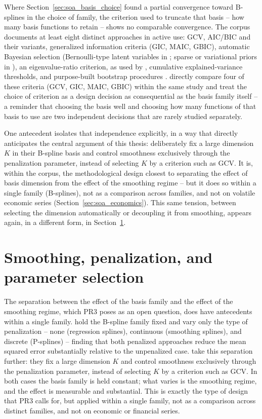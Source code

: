 Where Section~\ref{sec:soa_basis_choice} found a partial convergence
toward B-splines in the choice of family, the criterion used to truncate
that basis -- how many basis functions to retain -- shows no comparable
convergence. The corpus documents at least eight distinct approaches in
active use: GCV, AIC/BIC and their variants, generalized information
criteria (GIC, MAIC, GBIC), automatic Bayesian selection (Bernoulli-type
latent variables in \cite{sousa_bayesian_2024}; sparse or variational
priors in \cite{tao_integrated_2025}), an eigenvalue-ratio criterion, as
used by \cite{linshang_nonstationary_2025}, cumulative explained-variance
thresholds, and purpose-built bootstrap procedures \cite{diks_noise_2023}.
\cite{beyaztas_comparison_2022} directly compare four of these criteria
(GCV, GIC, MAIC, GBIC) within the same study and treat the choice of
criterion as a design decision as consequential as the basis family
itself -- a reminder that choosing the basis well and choosing how many
functions of that basis to use are two independent decisions that are
rarely studied separately.

One antecedent isolates that independence explicitly, in a way that
directly anticipates the central argument of this thesis:
\cite{gao_factor_2024} deliberately fix a large dimension $K$ in their
B-spline basis and control smoothness exclusively through the
penalization parameter, instead of selecting $K$ by a criterion such as
GCV. It is, within the corpus, the methodological design closest to
separating the effect of basis dimension from the effect of the
smoothing regime -- but it does so within a single family (B-splines),
not as a comparison across families, and not on volatile economic series
(Section~\ref{sec:soa_economics}). This same tension, between selecting
the dimension automatically or decoupling it from smoothing, appears
again, in a different form, in Section~\ref{sec:soa_smoothing}.

\section{Smoothing, penalization, and parameter selection}
\label{sec:soa_smoothing}

The separation between the effect of the basis family and the effect of
the smoothing regime, which PR3 poses as an open question, does have
antecedents within a single family. \cite{aguilera_comparative_2013} hold
the B-spline family fixed and vary only the type of penalization -- none
(regression splines), continuous (smoothing splines), and discrete
(P-splines) -- finding that both penalized approaches reduce the mean
squared error substantially relative to the unpenalized case.
\cite{gao_factor_2024} take this separation further: they fix a large
dimension $K$ and control smoothness exclusively through the
penalization parameter, instead of selecting $K$ by a criterion such as
GCV. In both cases the basis family is held constant; what varies is the
smoothing regime, and the effect is measurable and substantial. This is
exactly the type of design that PR3 calls for, but applied within a
single family, not as a comparison across distinct families, and not on
economic or financial series.

